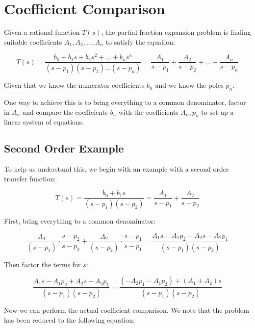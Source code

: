 \section{Coefficient Comparison}

Given a rational  function  $T(s)$,  the partial fraction expansion problem is
finding suitable coefficients ${A_1,A_2,\ldots,A_n}$ to  satisfy the equation:

\begin{equation}
    T(s) = \frac{b_0 + b_1s + b_2s^2 + \ldots + b_ns^n}{(s-p_1)(s-p_2)\ldots(s-p_n)} = \frac{A_1}{s-p_1} + \frac{A_2}{s-p_2} + \ldots + \frac{A_n}{s-p_n}
\end{equation}

Given that we know the numerator coefficients $b_n$  and  we  know  the  poles
$p_n$.

One way to achieve this is to bring everything to a common denominator, factor
in $A_n$ and compare the coefficients $b_n$ with the coefficients $A_n,p_n$ to
set up a linear system of equations.


\subsection{Second Order Example}

To help us understand this,  we  begin  with  an  example  with a second order
transfer function:

\begin{equation}
    T(s) = \frac{b_0 + b_1s}{(s-p_1)(s-p_2)} = \frac{A_1}{s-p_1} + \frac{A_2}{s-p_2}
\end{equation}

First, bring everything to a common denominator:

\begin{equation}
    \frac{A_1}{(s-p_1)}\cdot\frac{s-p_2}{s-p_2} + \frac{A_2}{(s-p_2)}\cdot\frac{s-p_1}{s-p_1} = \frac{A_1s - A_1p_2 + A_2s - A_2p_1}{(s-p_1)(s-p_2)}
\end{equation}

Then factor the terms for $s$:

\begin{equation}
    \frac{A_1s - A_1p_2 + A_2s - A_2p_1}{(s-p_1)(s-p_2)} = \frac{(-A_2p_1 -A_1p_2) + (A_1+A_2)s}{(s-p_1)(s-p_2)}
\end{equation}

Now we can perform the actual coefficient comparison. We note that the problem
has been reduced to the following equation:

